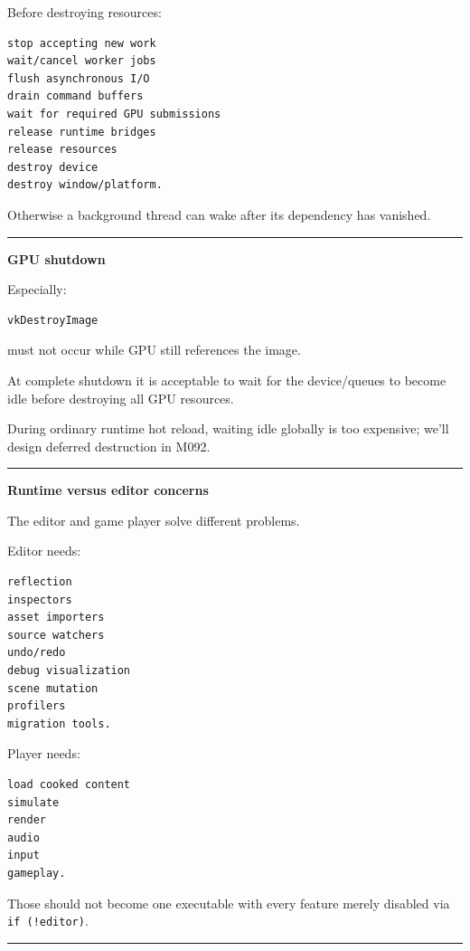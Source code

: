 Before destroying resources:

\begin{verbatim}
stop accepting new work
wait/cancel worker jobs
flush asynchronous I/O
drain command buffers
wait for required GPU submissions
release runtime bridges
release resources
destroy device
destroy window/platform.
\end{verbatim}

Otherwise a background thread can wake after its dependency has vanished.

\begin{center}\rule{0.5\linewidth}{0.5pt}\end{center}

\textbf{GPU shutdown}

Especially:

\begin{verbatim}
vkDestroyImage
\end{verbatim}

must not occur while GPU still references the image.

At complete shutdown it is acceptable to wait for the device/queues to become idle before destroying all GPU resources.

During ordinary runtime hot reload, waiting idle globally is too expensive; we'll design deferred destruction in M092.

\begin{center}\rule{0.5\linewidth}{0.5pt}\end{center}

\textbf{Runtime versus editor concerns}

The editor and game player solve different problems.

Editor needs:

\begin{verbatim}
reflection
inspectors
asset importers
source watchers
undo/redo
debug visualization
scene mutation
profilers
migration tools.
\end{verbatim}

Player needs:

\begin{verbatim}
load cooked content
simulate
render
audio
input
gameplay.
\end{verbatim}

Those should not become one executable with every feature merely disabled via \texttt{if\ (!editor)}.

\begin{center}\rule{0.5\linewidth}{0.5pt}\end{center}


